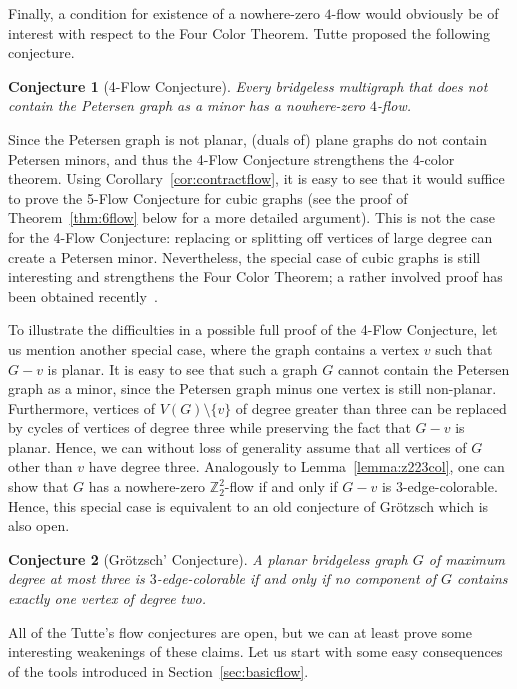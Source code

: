 \documentclass[12pt,twoside,openright,a4paper]{book}
\newtheorem{conjecture}{Conjecture}[chapter]
\begin{document}
Finally, a condition for existence of a nowhere-zero $4$-flow would obviously be of interest with respect to the Four Color Theorem.
Tutte proposed the following conjecture.
\begin{conjecture}[4-Flow Conjecture]
Every bridgeless multigraph that does not contain the Petersen graph as a minor has a nowhere-zero $4$-flow.
\end{conjecture}
Since the Petersen graph is not planar, (duals of) plane graphs do not contain Petersen minors, and thus
the 4-Flow Conjecture strengthens the 4-color theorem.  Using Corollary~\ref{cor:contractflow}, it is easy to see that it would suffice
to prove the 5-Flow Conjecture for cubic graphs (see the proof of Theorem~\ref{thm:6flow} below for a more
detailed argument).  This is not the case for the 4-Flow Conjecture: replacing or splitting off vertices of large degree can create
a Petersen minor.  Nevertheless, the special case of cubic graphs is still interesting and strengthens the Four Color Theorem;
a rather involved proof has been obtained recently~\cite{flow431,flow432,flow433}.

To illustrate the difficulties in a possible full proof of the 4-Flow Conjecture, let us mention another special case,
where the graph contains a vertex $v$ such that $G-v$ is planar.  
It is easy to see that such a graph $G$ cannot contain the Petersen graph as a minor, since the Petersen graph minus one vertex is still non-planar.
Furthermore, vertices of $V(G)\setminus \{v\}$ of degree greater than three can be replaced by cycles of vertices of degree three while preserving the fact that $G-v$ is planar.
Hence, we can without loss of generality assume that all vertices of $G$ other than $v$ have degree three.
Analogously to Lemma~\ref{lemma:z223col}, one can show that $G$ has a nowhere-zero $\mathbb{Z}_2^2$-flow if and only if $G-v$ is $3$-edge-colorable.
Hence, this special case is equivalent to an old conjecture of Gr\"{o}tzsch which is also open.
\begin{conjecture}[Gr\"{o}tzsch' Conjecture]
A planar bridgeless graph $G$ of maximum degree at most three is $3$-edge-colorable if and only if no component of $G$ contains
exactly one vertex of degree two.
\end{conjecture}

All of the Tutte's flow conjectures are open, but we can at least prove some interesting weakenings of these
claims.  Let us start with some easy consequences of the tools introduced in Section~\ref{sec:basicflow}.
\end{document}
